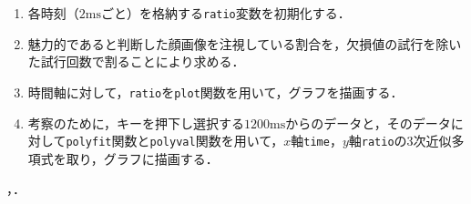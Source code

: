 \begin{enumerate}
\begin{enumerate}
              \item 最終的に魅力的であると判断した顔画像を注視している場合は\texttt{1}，そうでない場合は\texttt{0}を\expos の4列目に代入する．この処理は，画面状態が\texttt{0}と欠損値に対しては行わない．
              \item {}で初期化済みの\texttt{mergeC}行列に対して，に\expos の\(1\)から\(500\)行目（判断前1秒間）のデータを格納する．
          \end{enumerate}
    \item 各時刻（\(2\textrm{ms}\)ごと）を格納する\texttt{ratio}変数を初期化する．
    \item 魅力的であると判断した顔画像を注視している割合を，欠損値の試行を除いた試行回数で割ることにより求める．
    \item 時間軸に対して，\texttt{ratio}を\texttt{plot}関数を用いて，グラフを描画する．
    \item 考察のために，キーを押下し選択する\(1200\textrm{ms}\)からのデータと，そのデータに対して\texttt{polyfit}関数と\texttt{polyval}関数を用いて，\(x\)軸\texttt{time}，\(y\)軸\texttt{ratio}の3次近似多項式を取り，グラフに描画する．
\end{enumerate}
\scall{\kadaia}，．
